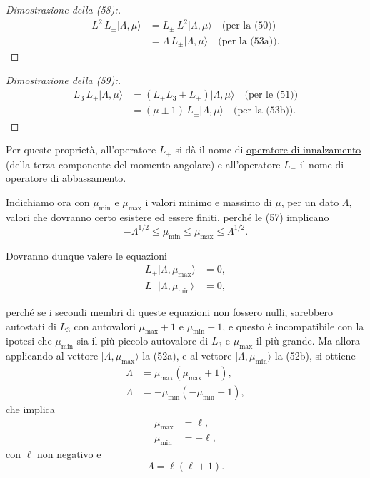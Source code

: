 \documentclass[11pt, a4paper]{book}
\numberwithin{equation}{section}
\begin{document}
\begin{proof}[Dimostrazione della (58):]
\begin{align*}
L^2\,L_\pm|\Lambda,\mu\rangle
  &= L_\pm\,L^2|\Lambda,\mu\rangle \quad \text{(per la (50))} \\
  &= \Lambda\,L_\pm|\Lambda,\mu\rangle \quad \text{(per la (53a))}.
\end{align*}
\end{proof}

\begin{proof}[Dimostrazione della (59):]
\begin{align*}
L_3\,L_\pm|\Lambda,\mu\rangle
  &= (L_\pm L_3 \pm L_\pm)|\Lambda,\mu\rangle \quad \text{(per le (51))} \\
  &= (\mu\pm1)\,L_\pm|\Lambda,\mu\rangle \quad \text{(per la (53b))}.
\end{align*}
\end{proof}

Per queste proprietà, all'operatore $L_+$ si dà il nome di
\underline{operatore di innalzamento} (della terza componente del momento
angolare) e all'operatore $L_-$ il nome di \underline{operatore di
abbassamento}.

Indichiamo ora con $\mu_{\min}$ e $\mu_{\max}$ i valori minimo e massimo
di $\mu$, per un dato $\Lambda$, valori che dovranno certo esistere ed
essere finiti, perché le (57) implicano
\begin{equation}
-\Lambda^{1/2} \leq \mu_{\min} \leq \mu_{\max} \leq \Lambda^{1/2}.
\end{equation}

Dovranno dunque valere le equazioni
\begin{align}
L_+|\Lambda,\mu_{\max}\rangle &= 0, \tag{61a} \\
L_-|\Lambda,\mu_{\min}\rangle &= 0, \tag{61b}
\end{align}


perché se i secondi membri di queste equazioni non fossero nulli,
sarebbero autostati di $L_3$ con autovalori $\mu_{\max}+1$ e
$\mu_{\min}-1$, e questo è incompatibile con la ipotesi che $\mu_{\min}$
sia il più piccolo autovalore di $L_3$ e $\mu_{\max}$ il più grande. Ma
allora applicando al vettore $|\Lambda,\mu_{\max}\rangle$ la (52a), e al
vettore $|\Lambda,\mu_{\min}\rangle$ la (52b), si ottiene
\begin{align}
\Lambda &= \mu_{\max}(\mu_{\max}+1), \tag{62a} \\
\Lambda &= -\mu_{\min}(-\mu_{\min}+1), \tag{62b}
\end{align}
che implica
\begin{align}
\mu_{\max} &= \ell, \tag{63a} \\
\mu_{\min} &= -\ell, \tag{63b}
\end{align}
con $\ell$ non negativo e
\begin{equation}
\Lambda = \ell(\ell+1).
\end{equation}
\end{document}
